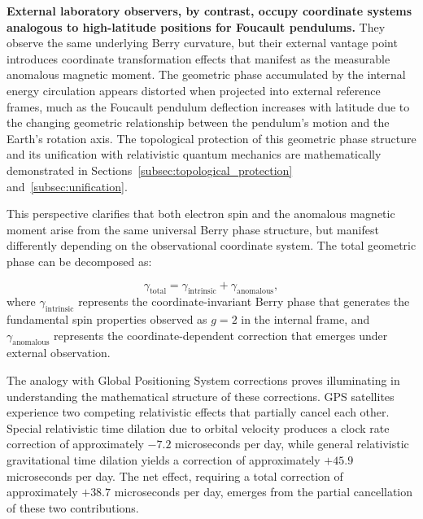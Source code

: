 \documentclass[%
 reprint,
 amsmath,amssymb,
 aps,
]{revtex4-1}
\numberwithin{equation}{section}%
\begin{document}
\textbf{External laboratory observers, by contrast, occupy coordinate systems analogous to high-latitude positions for Foucault pendulums.} They observe the same underlying Berry curvature, but their external vantage point introduces coordinate transformation effects that manifest as the measurable anomalous magnetic moment. The geometric phase accumulated by the internal energy circulation appears distorted when projected into external reference frames, much as the Foucault pendulum deflection increases with latitude due to the changing geometric relationship between the pendulum's motion and the Earth's rotation axis. The topological protection of this geometric phase structure and its unification with relativistic quantum mechanics are mathematically demonstrated in Sections~\ref{subsec:topological_protection} and~\ref{subsec:unification}.

This perspective clarifies that both electron spin and the anomalous magnetic moment arise from the same universal Berry phase structure, but manifest differently depending on the observational coordinate system. The total geometric phase can be decomposed as:

\begin{equation}
\gamma_{\text{total}} = \gamma_{\text{intrinsic}} + \gamma_{\text{anomalous}}, \label{eq:phase_decomposition}
\end{equation}
where $\gamma_{\text{intrinsic}}$ represents the coordinate-invariant Berry phase that generates the fundamental spin properties observed as $g = 2$ in the internal frame, and $\gamma_{\text{anomalous}}$ represents the coordinate-dependent correction that emerges under external observation.

The analogy with Global Positioning System corrections proves illuminating in understanding the mathematical structure of these corrections. GPS satellites experience two competing relativistic effects that partially cancel each other. Special relativistic time dilation due to orbital velocity produces a clock rate correction of approximately $-7.2$ microseconds per day, while general relativistic gravitational time dilation yields a correction of approximately $+45.9$ microseconds per day. The net effect, requiring a total correction of approximately $+38.7$ microseconds per day, emerges from the partial cancellation of these two contributions.
\end{document}
